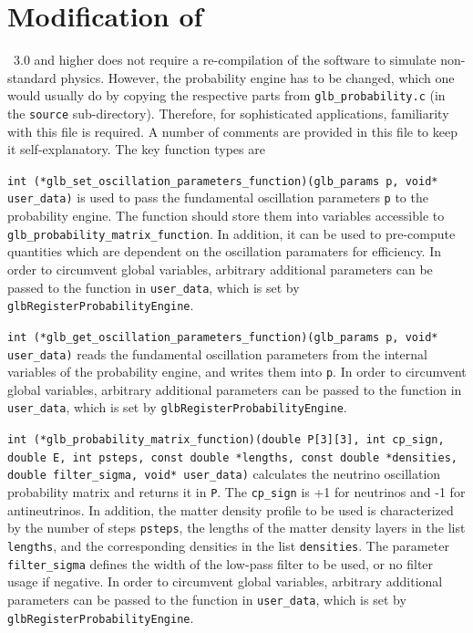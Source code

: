 \section{Modification of \GLOBES }

\GLOBES\ 3.0 and higher does not require a re-compilation of the software to simulate non-standard physics.
However, the probability engine has to be changed, which one would usually do by copying the respective parts from {\tt glb\_probability.c} (in the {\tt source} sub-directory). Therefore, for sophisticated applications, familiarity with this file is required. A number of comments are provided in this file to keep it self-explanatory.
The key function types are
\begin{function}
{\tt int (*glb\_set\_oscillation\_parameters\_function)(glb\_params p, void* user\_data)} is
used to pass the fundamental oscillation parameters {\tt p} to the probability engine.
The function should store them into variables accessible to {\tt glb\_probability\_matrix\_function}.
In addition, it can be used to pre-compute quantities which are dependent on the oscillation paramaters for efficiency. 
In order to circumvent global variables, arbitrary additional parameters can be
passed to the function in {\tt user\_data}, which is set by {\tt glbRegisterProbabilityEngine}.
\end{function}
\begin{function}
{\tt int (*glb\_get\_oscillation\_parameters\_function)(glb\_params p, void* user\_data)}
reads the fundamental oscillation parameters from the internal variables of the probability
engine, and writes them into {\tt p}.
In order to circumvent global variables, arbitrary additional parameters can be
passed to the function in {\tt user\_data}, which is set by {\tt glbRegisterProbabilityEngine}.
\end{function}
\begin{function}
{\tt int (*glb\_probability\_matrix\_function)(double P[3][3], int cp\_sign, double E,
                  int psteps, const double *lengths, const double *densities,
                  double filter\_sigma, void* user\_data)}
calculates the neutrino oscillation probability matrix and returns it in {\tt P}.
The {\tt cp\_sign} is +1 for neutrinos and -1 for antineutrinos. In addition, the matter
density profile to be used is characterized by the number of steps {\tt psteps}, the
lengths of the matter density layers in the list {\tt lengths}, and the corresponding
densities in the list {\tt densities}. The parameter {\tt filter\_sigma} defines
the width of the low-pass filter to be used, or no filter usage if negative.
In order to circumvent global variables, arbitrary additional parameters can be
passed to the function in {\tt user\_data}, which is set by {\tt glbRegisterProbabilityEngine}.
\end{function}
